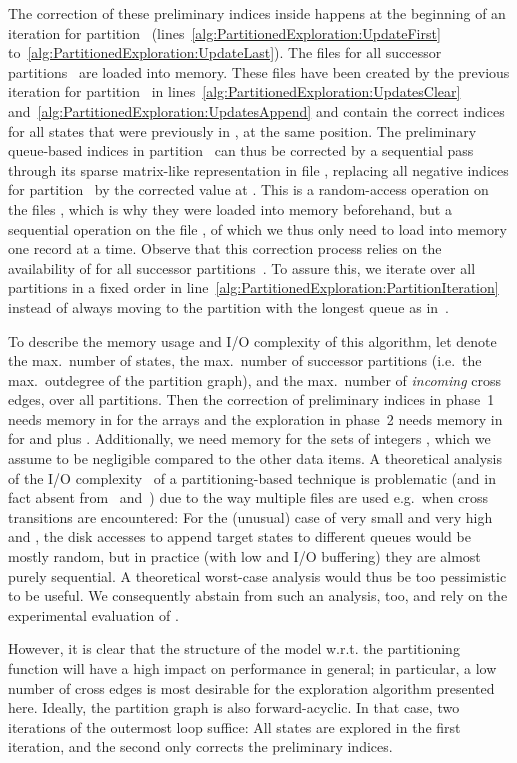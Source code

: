 \documentclass{llncs}
\newcommand{\eg}{e.g.\ }
\newcommand{\ie}{i.e.\ }
\newcommand{\wrt}{w.r.t.\xspace}
\begin{document}
The correction of these preliminary indices inside  happens at the beginning of an iteration for partition~ (lines~\ref{alg:PartitionedExploration:UpdateFirst} to~\ref{alg:PartitionedExploration:UpdateLast}).
The files  for all successor partitions~ are loaded into memory.
These files have been created by the previous iteration for partition~ in lines~\ref{alg:PartitionedExploration:UpdatesClear} and~\ref{alg:PartitionedExploration:UpdatesAppend} and contain the correct indices for all states that were previously in , at the same position.
The preliminary queue-based indices in partition~ can thus be corrected by a sequential pass through its sparse matrix-like representation in file , replacing all negative indices  for partition~ by the corrected value at .
This is a random-access operation on the files , which is why they were loaded into memory beforehand, but a sequential operation on the file , of which we thus only need to load into memory one record at a time.
Observe that this correction process relies on the availability of  for all successor partitions~.
To assure this, we iterate over all partitions in a fixed order in line~\ref{alg:PartitionedExploration:PartitionIteration} instead of always moving to the partition with the longest queue as in~\cite{BJ05,EK13}.

To describe the memory usage and I/O complexity of this algorithm, let  denote the max.\ number of states,  the max.\ number of successor partitions (\ie the max.\ outdegree of the partition graph), and  the max.\ number of \emph{incoming} cross edges, over all partitions.
Then the correction of preliminary indices in phase~1 needs memory in  for the  arrays and the exploration in phase~2 needs memory in  for  and  plus .
Additionally, we need memory for the sets of integers , which we assume to be negligible compared to the other data items.
A theoretical analysis of the I/O complexity~\cite{AV88} of a partitioning-based technique is problematic (and in fact absent from~\cite{BJ05} and~\cite{EK13}) due to the way multiple files are used \eg when cross transitions are encountered:
For the (unusual)  case of very small  and very high  and , the disk accesses to append target states to different queues would be mostly random, but in practice (with low  and I/O buffering) they are almost purely sequential.
A theoretical worst-case analysis would thus be too pessimistic to be useful.
We consequently abstain from such an analysis, too, and rely on the experimental evaluation of .

However, it is clear that the structure of the model \wrt the partitioning function will have a high impact on performance in general; in particular, a low number of cross edges is most desirable for the exploration algorithm presented here.
Ideally, the partition graph is also forward-acyclic.
In that case, two iterations of the outermost loop suffice:
All states are explored in the first iteration, and the second only corrects the preliminary indices.
\end{document}
